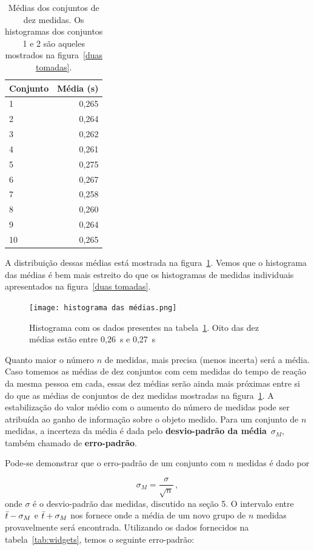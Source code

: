 \documentclass[12pt, a4paper]{article}
\begin{document}
\begin{table} [H]
\centering
\begin{tabular}{l|r}
Conjunto & Média (s) \\\hline
1 & 0,265 \\
2 & 0,264 \\
3 & 0,262 \\
4 & 0,261 \\
5 & 0,275 \\
6 & 0,267 \\
7 & 0,258 \\
8 & 0,260 \\
9 & 0,264 \\
10 & 0,265\\
\end{tabular}
\caption{\label{tabela médias} Médias dos conjuntos de dez medidas. Os histogramas dos conjuntos 1 e 2 são aqueles mostrados na figura~\ref{duas tomadas}.}
\end{table}

A distribuição dessas médias está mostrada na figura~\ref{histograma das médias}. Vemos que o histograma das médias é bem mais estreito do que os histogramas de medidas individuais apresentados na figura~\ref{duas tomadas}.
 
\begin{figure}[H]
    \centering
    \texttt{[image: histograma das médias.png]}
    \caption{Histograma com os dados presentes na tabela~\ref{tabela médias}. Oito das dez médias estão entre 0,26~s e 0,27~s}
    \label{histograma das médias}
\end{figure}



 Quanto maior o número $n$ de medidas, mais precisa (menos incerta) será a média. Caso tomemos as médias de dez conjuntos com cem medidas do tempo de reação da mesma pessoa em cada, essas dez médias serão ainda mais próximas entre si do que as médias de conjuntos de dez medidas mostradas na figura~\ref{histograma das médias}. A estabilização do valor médio com o aumento do número de medidas pode ser atribuída ao ganho de informação sobre o objeto medido. Para um conjunto de $n$ medidas, a incerteza da média é dada pelo \textbf{desvio-padrão da média}~$\sigma_M$, também chamado de \textbf{erro-padrão}.

Pode-se demonstrar que o erro-padrão de um conjunto com $n$ medidas é dado por

\[\sigma_M=\frac{\sigma}{\sqrt{n}}\, ,\]
onde $\sigma$ é o desvio-padrão das medidas, discutido na seção 5. O intervalo entre $\Bar{t} - \sigma_M$ e $\Bar{t} + \sigma_M$ nos fornece onde a média de um novo grupo de $n$ medidas provavelmente será encontrada.
Utilizando os dados fornecidos na tabela~\ref{tab:widgets}, temos o seguinte erro-padrão:
\end{document}
